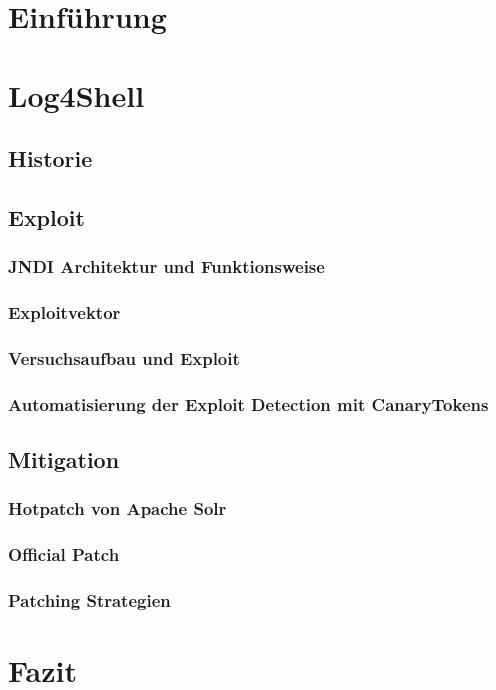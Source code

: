 

\section{Einführung}\label{sec:einfuhrung}

\section{Log4Shell}\label{sec:log4shell}
\subsection{Historie}\label{subsec:historie}



\subsection{Exploit}\label{subsec:exploit}
\subsubsection{JNDI Architektur und Funktionsweise}
\subsubsection{Exploitvektor}
\subsubsection{Versuchsaufbau und Exploit}
\subsubsection{Automatisierung der Exploit Detection mit CanaryTokens}
\subsection{Mitigation}\label{subsec:mitigation}

\subsubsection{Hotpatch von Apache Solr}
\subsubsection{Official Patch}
\subsubsection{Patching Strategien}
\section{Fazit}\label{sec:fazit}

%
